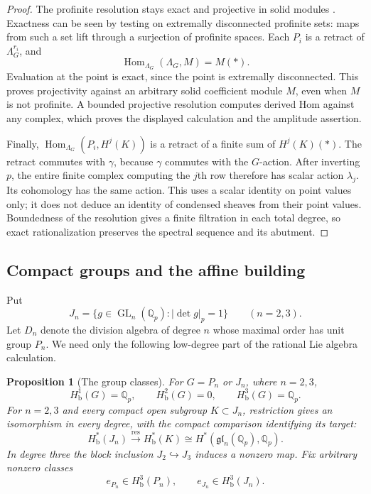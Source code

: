 \documentclass[11pt]{article}
\numberwithin{equation}{section}
\newtheorem{proposition}[theorem]{Proposition}
\theoremstyle{definition}
\theoremstyle{remark}
\begin{document}
\begin{proof}
The profinite resolution stays exact and projective in solid
modules \cite[Theorems~3.2 and~3.14(i)]{Tang2026}.
Exactness can be seen by testing on extremally
disconnected profinite sets: maps from such a set lift through a
surjection of profinite spaces.  Each $P_i$ is a retract of
$\Lambda_G^{r_i}$, and
\[
 \operatorname{Hom}_{\Lambda_G}(\Lambda_G,M)=M(*).
\]
Evaluation at the point is exact, since the point is extremally
disconnected.  This proves projectivity against an arbitrary solid
coefficient module $M$, even when $M$ is not profinite.  A bounded
projective resolution computes derived Hom against any complex,
which proves the displayed calculation and the amplitude assertion.

Finally, $\operatorname{Hom}_{\Lambda_G}(P_i,H^j(K))$ is a retract of a finite
sum of $H^j(K)(*)$.  The retract commutes with $\gamma$, because
$\gamma$ commutes with the $G$-action.  After inverting $p$, the
entire finite complex computing the $j$th row therefore has scalar
action $\lambda_j$.  Its cohomology has the same action.
This uses a scalar identity on point values only; it does not
deduce an identity of condensed sheaves from their point values.
Boundedness of the resolution gives a finite filtration in each
total degree, so exact rationalization preserves the spectral
sequence and its abutment.
\end{proof}

\subsection{Compact groups and the affine building}

Put
\[
 J_n=\{g\in\operatorname{GL}_n(\mathbb Q_p):|\det g|_p=1\}\qquad(n=2,3).
\]
Let $D_n$ denote the division algebra of degree $n$ whose maximal
order has unit group $P_n$.  We need only the following low-degree
part of the rational Lie algebra calculation.

\begin{proposition}[The group classes]
\label{prop:group-classes}
For $G=P_n$ or $J_n$, where $n=2,3$,
\[
 H^1_{\mathrm b}(G)=\mathbb Q_p,
 \qquad H^2_{\mathrm b}(G)=0,
 \qquad H^3_{\mathrm b}(G)=\mathbb Q_p.
\]
For $n=2,3$ and every compact open subgroup $K\subset J_n$,
restriction gives an isomorphism in every degree, with the compact
comparison identifying its target:
\[
 H^*_{\mathrm b}(J_n)\xrightarrow{\mathrm{res}}H^*_{\mathrm b}(K)
 \cong H^*(\mathfrak{gl}_n(\mathbb Q_p),\mathbb Q_p).
\]
In degree three the block inclusion $J_2\hookrightarrow J_3$
induces a nonzero map.  Fix arbitrary nonzero classes
\[
 e_{P_n}\in H^3_{\mathrm b}(P_n),\qquad
 e_{J_n}\in H^3_{\mathrm b}(J_n).
\]
\end{proposition}
\end{document}

